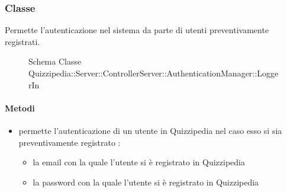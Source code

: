 \subsubsection{Classe }
Permette l'autenticazione nel sistema da parte di utenti preventivamente registrati.
\begin{figure}[H]
\centering
\noindent{}
\caption[Schema Classe LoggerIn]{Schema Classe Quizzipedia::Server::ControllerServer::AuthenticationManager::LoggerIn}
\end{figure}
\paragraph{Metodi}
\begin{itemize}
\item {}
\newline
permette l'autenticazione di un utente in Quizzipedia nel caso esso si sia preventivamente registrato
\newline
{} :
\begin{itemize}
\item {}
\newline
la email con la quale l'utente si è registrato in Quizzipedia
\item {}
\newline
la password con la quale l'utente si è registrato in Quizzipedia
\end{itemize}
\end{itemize}
